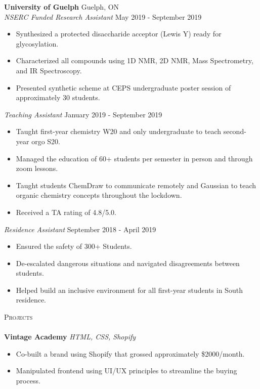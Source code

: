 \documentclass[a4paper]{article}
\newcommand{\lineunder} {
    \vspace*{-8pt} \\
    \hspace*{-18pt} \hrulefill \\
}
\newcommand{\header} [1] {
    {\hspace*{-18pt}\vspace*{6pt} \textsc{#1}}
    \vspace*{-6pt} \lineunder
}
\begin{document}
\textbf{University of Guelph} \hfill Guelph, ON\\
\textit{NSERC Funded Research Assistant} \hfill May 2019 - September 2019\\
\vspace{-1mm}
\begin{itemize} \itemsep 1pt
	\item Synthesized a protected disaccharide acceptor (Lewis Y) ready for glycosylation.
	\item Characterized all compounds using 1D NMR, 2D NMR, Mass Spectrometry, and IR Spectroscopy.
	\item Presented synthetic scheme at CEPS undergraduate poster session of approximately 30 students.
\end{itemize}

\textit{Teaching Assistant} \hfill January 2019 - September 2019\\
\vspace{-1mm}
\begin{itemize} \itemsep 1pt
	\item Taught first-year chemistry W20 and only undergraduate to teach second-year orgo S20. 
	\item Managed the education of 60+ students per semester in person and through zoom lessons.
        \item Taught students ChemDraw to communicate remotely and Gaussian to teach organic chemistry concepts throughout the lockdown.
	\item Received a TA rating of 4.8/5.0.
\end{itemize}

\textit{Residence Assistant} \hfill September 2018 - April 2019\\
\vspace{-1mm}
\begin{itemize} \itemsep 1pt
	\item Ensured the safety of 300+ Students.
	\item De-escalated dangerous situations and navigated disagreements between students.
        \item Helped build an inclusive environment for all first-year students in South residence.
\end{itemize}


\header{Projects}
{\textbf{Vintage Academy}} {\sl HTML, CSS, Shopify} \\
\vspace{-1mm}
\begin{itemize} \itemsep 1pt
	\item Co-built a brand using Shopify that grossed approximately      \$2000/month.
	\item Manipulated frontend using UI/UX principles to streamline the buying process.\\
\end{itemize}
\vspace*{1mm}
\end{document}
